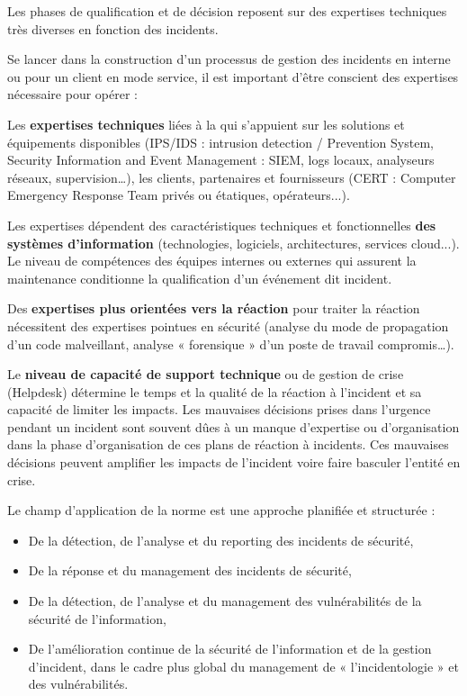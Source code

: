 Les phases de qualification et de décision reposent sur des expertises techniques très diverses en fonction des incidents.

Se lancer dans la construction d'un processus de gestion des incidents en interne ou pour un client en mode service, il est important d'être conscient des expertises nécessaire pour opérer :

Les \textbf{expertises techniques} liées à la \textbf{} qui s’appuient sur les solutions et équipements disponibles (IPS/IDS : intrusion detection / Prevention System, Security Information and Event Management : SIEM, logs locaux, analyseurs réseaux, supervision…), les clients,  partenaires et fournisseurs (CERT : Computer Emergency Response Team privés ou étatiques, opérateurs...).

Les expertises dépendent des caractéristiques techniques et fonctionnelles \textbf{des systèmes d’information} (technologies, logiciels, architectures, services cloud...). Le niveau de compétences des équipes internes ou externes qui assurent la maintenance conditionne la qualification  d’un événement dit incident. 

Des \textbf{expertises  plus orientées vers la réaction }pour traiter la réaction nécessitent des expertises pointues en sécurité (analyse du mode de propagation d’un code malveillant, analyse « forensique » d’un poste de travail  compromis…).

Le \textbf{niveau de capacité de support technique }ou de gestion de crise (Helpdesk) détermine le temps et la qualité de la réaction à l’incident et sa capacité de limiter les impacts. Les mauvaises décisions prises dans l’urgence pendant un incident sont souvent dûes à un manque d’expertise ou d’organisation dans la phase d'organisation de ces plans de réaction à incidents. Ces mauvaises décisions peuvent amplifier les impacts de l’incident voire faire basculer l’entité en crise.

Le  champ d’application de la norme est une approche planifiée et structurée :
\begin{itemize}
  \item De la détection, de l'analyse et du reporting des incidents de sécurité,
  \item De la réponse et du management des incidents de sécurité,
  \item De la détection, de l’analyse et du management des vulnérabilités de la sécurité de l’information,
  \item De l’amélioration continue de la sécurité de l’information et de la gestion d’incident, dans le cadre plus global du management de « l’incidentologie » et des vulnérabilités.
\end{itemize}


